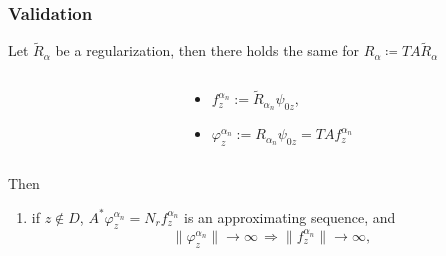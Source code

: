 \documentclass[10pt,xcolor={dvipsnames}]{beamer}
\theoremstyle{plain}
\theoremstyle{plain}
\let\phi\varphi
\begin{document}
\begin{frame}
 \frametitle{Validation}
Let $\tilde{R}_\alpha$ be a regularization, then there holds the same for $R_\alpha\coloneqq TA\tilde{R}_\alpha$
\begin{columns}[T]
 \begin{column}{0.5\textwidth}
 \end{column}
 \begin{column}{0.5\textwidth}
 \begin{itemize}
  \item $f_z^{\alpha_n}:=\tilde{R}_{\alpha_n}\psi_{0z}$,
  \item $\phi_z^{\alpha_n}:=R_{\alpha_n}\psi_{0z} = TA f_z^{\alpha_n}$
 \end{itemize}
  \end{column}
\end{columns}

\begin{corollary}
Then
\begin{enumerate}
 \item if $z\notin D$, $A^*\phi_z^{\alpha_n} = {N_r}f_z^{\alpha_n}$ is an 
 approximating sequence, and
\begin{equation*}
 \|\phi_z^{\alpha_n}\|\to\infty\,\Rightarrow\|f_z^{\alpha_n}\|\to\infty,
\end{equation*}


\end{enumerate}
\end{corollary}
\end{frame}
\end{document}
